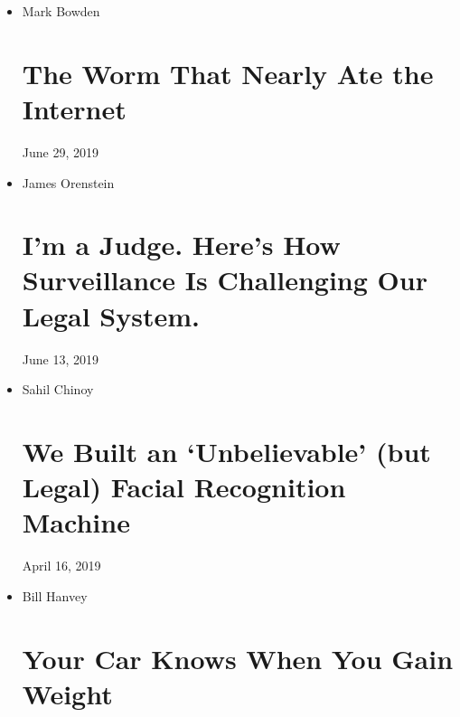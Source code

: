 \begin{itemize}
\item
  Mark Bowden

  \href{https://www.nytimes.com/2019/06/29/opinion/sunday/conficker-worm-ukraine.html}{}

  \hypertarget{the-worm-that-nearly-ate-the-internet}{%
  \section{The Worm That Nearly Ate the
  Internet}\label{the-worm-that-nearly-ate-the-internet}}

  June 29, 2019
\item
  James Orenstein

  \href{https://www.nytimes.com/2019/06/13/opinion/privacy-law-enforcment-congress.html}{}

  \hypertarget{im-a-judge-heres-how-surveillance-is-challenging-our-legal-system}{%
  \section{I'm a Judge. Here's How Surveillance Is Challenging Our Legal
  System.}\label{im-a-judge-heres-how-surveillance-is-challenging-our-legal-system}}

  June 13, 2019
\item
  Sahil Chinoy

  \href{https://www.nytimes.com/interactive/2019/04/16/opinion/facial-recognition-new-york-city.html}{}

  \hypertarget{we-built-an-unbelievable-but-legal-facial-recognition-machine}{%
  \section{We Built an `Unbelievable' (but Legal) Facial Recognition
  Machine}\label{we-built-an-unbelievable-but-legal-facial-recognition-machine}}

  April 16, 2019
\item
  Bill Hanvey

  \href{https://www.nytimes.com/2019/05/20/opinion/car-repair-data-privacy.html}{}

  \hypertarget{your-car-knows-when-you-gain-weight}{%
  \section{Your Car Knows When You Gain
  Weight}\label{your-car-knows-when-you-gain-weight}}


\end{itemize}
